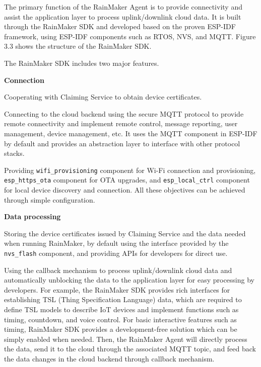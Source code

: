 \documentclass[a4paper,12pt]{book}
\begin{document}
The primary function of the RainMaker Agent is to provide connectivity and assist the application layer to process uplink/downlink cloud data. It is built through the RainMaker SDK and developed based on the proven ESP-IDF framework, using ESP-IDF components such as RTOS, NVS, and MQTT. Figure 3.3 shows the structure of the RainMaker SDK.

The RainMaker SDK includes two major features.

\textbf{Connection}
\begin{enumerate}[label=\roman*.]
    {
    \item Cooperating with Claiming Service to obtain device certificates.
    \item Connecting to the cloud backend using the secure MQTT protocol to provide remote connectivity and implement remote control, message reporting, user management, device management, etc. It uses the MQTT component in ESP-IDF by default and provides an abstraction layer to interface with other protocol stacks.
    \item Providing \texttt{wifi\_provisioning} component for Wi-Fi connection and provisioning, \texttt{esp\_https\_ota} component for OTA upgrades, and \texttt{esp\_local\_ctrl} component for local device discovery and connection. All these objectives can be achieved through simple configuration.
    
    }
\end{enumerate}

\textbf{Data processing}
\begin{enumerate}[label=\roman*.]
    {
    \item Storing the device certificates issued by Claiming Service and the data needed when running RainMaker, by default using the interface provided by the \texttt{nvs\_flash} component, and providing APIs for developers for direct use.
    \item Using the callback mechanism to process uplink/downlink cloud data and automatically unblocking the data to the application layer for easy processing by developers. For example, the RainMaker SDK provides rich interfaces for establishing TSL (Thing Specification Language) data, which are required to define TSL models to describe IoT devices and implement functions such as timing, countdown, and voice control. For basic interactive features such as timing, RainMaker SDK provides a development-free solution which can be simply enabled when needed. Then, the RainMaker Agent will directly process the data, send it to the cloud through the associated MQTT topic, and feed back the data changes in the cloud backend through callback mechanism.
    
    }
\end{enumerate}
\end{document}
